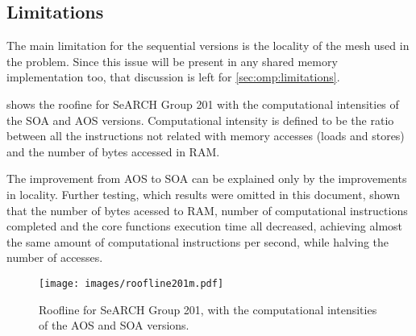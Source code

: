 \subsection{Limitations}

The main limitation for the sequential versions is the locality of the mesh used in the problem. Since this issue will be present in any shared memory implementation too, that discussion is left for \cref{sec:omp:limitations}.

 shows the roofine for SeARCH Group 201 with the computational intensities of the SOA and AOS versions. Computational intensity is defined to be the ratio between all the instructions not related with memory accesses (loads and stores) and the number of bytes accessed in RAM.

The improvement from AOS to SOA can be explained only by the improvements in locality. Further testing, which results were omitted in this document, shown that the number of bytes acessed to RAM, number of computational instructions completed and the core functions execution time all decreased, achieving almost the same amount of computational instructions per second, while halving the number of accesses.

\begin{figure}
	\centering
	\texttt{[image: images/roofline201m.pdf]}
	\caption{Roofline for SeARCH Group 201, with the computational intensities of the AOS and SOA versions.}
	\label{fig:roofline201}
\end{figure}
